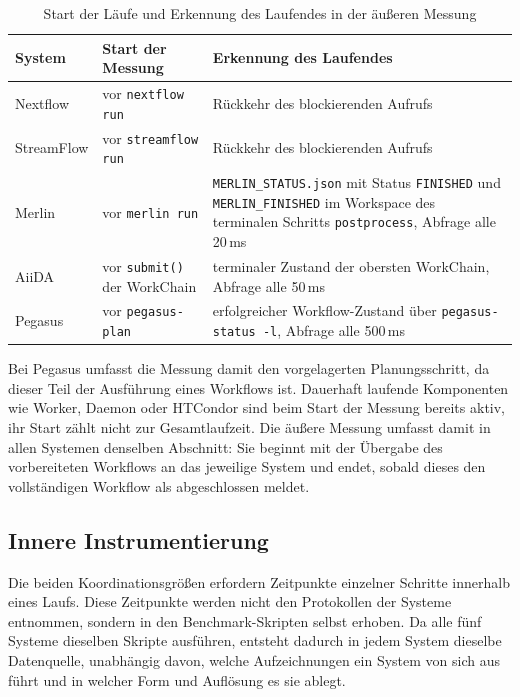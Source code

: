 \begin{table}[H]
  \caption{Start der Läufe und Erkennung des Laufendes in der äußeren Messung}
  \label{tab:methodik:endeerkennung}
  \centering
  \footnotesize
  \renewcommand{\arraystretch}{1.3}
  \begin{tabular}{>{\raggedright\arraybackslash}p{1.8cm}
                  >{\raggedright\arraybackslash}p{3.4cm}
                  >{\raggedright\arraybackslash}p{7.0cm}}
    \hline
    \textbf{System} & \textbf{Start der Messung} & \textbf{Erkennung des Laufendes} \\
    \hline
    Nextflow & vor \texttt{nextflow run} & Rückkehr des blockierenden Aufrufs \\
    StreamFlow & vor \texttt{streamflow run} & Rückkehr des blockierenden Aufrufs \\
    Merlin & vor \texttt{merlin run} & \texttt{MERLIN\_STATUS.json} mit Status \texttt{FINISHED} und \texttt{MERLIN\_FINISHED} im Workspace des terminalen Schritts \texttt{postprocess}, Abfrage alle 20\,ms \\
    AiiDA & vor \texttt{submit()} der WorkChain & terminaler Zustand der obersten WorkChain, Abfrage alle 50\,ms \\
    Pegasus & vor \texttt{pegasus-plan} & erfolgreicher Workflow-Zustand über \texttt{pegasus-status -l}, Abfrage alle 500\,ms \\
    \hline
  \end{tabular}
\end{table}

Bei Pegasus umfasst die Messung damit den vorgelagerten
Planungsschritt, da dieser Teil der Ausführung eines Workflows ist. Dauerhaft laufende Komponenten wie Worker, Daemon oder HTCondor sind beim Start der Messung bereits aktiv, ihr Start zählt nicht zur Gesamtlaufzeit. Die äußere Messung umfasst damit in allen Systemen denselben Abschnitt: Sie beginnt mit der Übergabe des vorbereiteten Workflows an das jeweilige System und endet, sobald dieses den vollständigen Workflow als abgeschlossen meldet.

\subsection{Innere Instrumentierung}
\label{sec:methodik:instrumentierung}

Die beiden Koordinationsgrößen erfordern Zeitpunkte einzelner
Schritte innerhalb eines Laufs. Diese Zeitpunkte werden nicht den
Protokollen der Systeme entnommen, sondern in den
Benchmark-Skripten selbst erhoben. Da alle fünf Systeme dieselben
Skripte ausführen, entsteht dadurch in jedem System dieselbe
Datenquelle, unabhängig davon, welche Aufzeichnungen ein System von
sich aus führt und in welcher Form und Auflösung es sie ablegt.

